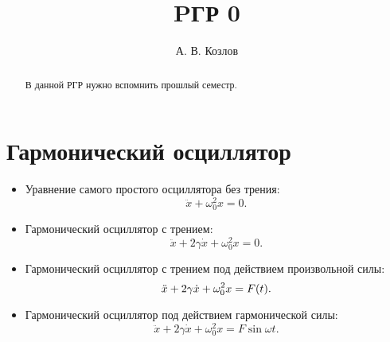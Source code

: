 \documentclass[a4paper,9pt,russian]{article}
\title{PГР 0}
\author{А. В. Козлов}
\begin{document}
\maketitle
\begin{abstract}
В данной РГР нужно вспомнить прошлый семестр.
\end{abstract}
\section{Гармонический осциллятор}
\begin{itemize}
	\item Уравнение самого простого осциллятора без трения:
\[
	\ddot x + \omega_0^2 x = 0
.\]
	\item Гармонический осциллятор с трением:
	\[
	\ddot x +2\gamma\dot x+  \omega_0^2 x = 0
	.\] 
	\item Гармонический осциллятор с трением под действием произвольной силы:
		\[
		\ddot x +2\gamma\dot x+  \omega_0^2 x = F\qty(t)
		.\] 
	\item Гармонический осциллятор под действием гармонической силы:
		\[
			\ddot x +2\gamma\dot x+  \omega_0^2 x = F\sin{\omega t}
		.\] 
\end{itemize}
\end{document}
